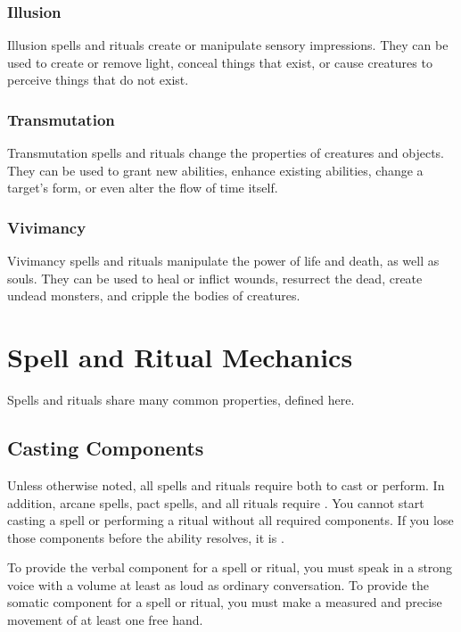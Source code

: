         \subsubsection{Illusion}
            Illusion spells and rituals create or manipulate sensory impressions.
            They can be used to create or remove light, conceal things that exist, or cause creatures to perceive things that do not exist.

        \subsubsection{Transmutation}
            Transmutation spells and rituals change the properties of creatures and objects.
            They can be used to grant new abilities, enhance existing abilities, change a target's form, or even alter the flow of time itself.

        \subsubsection{Vivimancy}
            Vivimancy spells and rituals manipulate the power of life and death, as well as souls.
            They can be used to heal or inflict wounds, resurrect the dead, create undead monsters, and cripple the bodies of creatures.

\section{Spell and Ritual Mechanics}\label{Spell and Ritual Mechanics}

    Spells and rituals share many common properties, defined here.

    \subsection{Casting Components}\label{Casting Components}
        Unless otherwise noted, all spells and rituals require both  to cast or perform.
        In addition, arcane spells, pact spells, and all rituals require .
        You cannot start casting a spell or performing a ritual without all required components.
        If you lose those components before the ability resolves, it is .

        To provide the verbal component for a spell or ritual, you must speak in a strong voice with a volume at least as loud as ordinary conversation.
        To provide the somatic component for a spell or ritual, you must make a measured and precise movement of at least one free hand.

